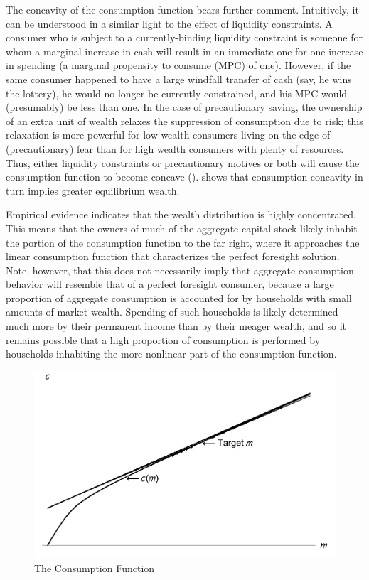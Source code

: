 The concavity of the consumption function bears further comment.
Intuitively, it can be understood in a similar light to the effect of
liquidity constraints. A consumer who is subject to a
currently-binding liquidity constraint is someone for whom a marginal
increase in cash will result in an immediate one-for-one increase in
spending (a marginal propensity to consume (MPC) of one).  However, if
the same consumer happened to have a large windfall transfer of cash
(say, he wins the lottery), he would no longer be currently
constrained, and his MPC would (presumably) be less than one.  In the
case of precautionary saving, the ownership of an extra unit of wealth
relaxes the suppression of consumption due to risk; this relaxation is
more powerful for low-wealth consumers living on the edge of
(precautionary) fear than for high wealth consumers with plenty of
resources.  Thus, either liquidity constraints or precautionary
motives or both will cause the consumption function to become concave
(\cite{carroll&kimball:liquidity}). \cite{huggett:higherW} shows that
consumption concavity in turn implies greater equilibrium wealth.  

Empirical evidence indicates that the wealth distribution is highly
concentrated.  This means that the owners of much of the aggregate
capital stock likely inhabit the portion of the consumption function
to the far right, where it approaches the linear consumption function
that characterizes the perfect foresight solution.  Note, however,
that this does not necessarily imply that aggregate consumption
behavior will resemble that of a perfect foresight consumer, because a
large proportion of aggregate consumption is accounted for by
households with small amounts of market wealth.  Spending of such
households is likely determined much more by their permanent income
than by their meager wealth, and so it remains possible that a high
proportion of consumption is performed by households inhabiting the
more nonlinear part of the consumption function.

\begin{figure}[ht]
\caption{The Consumption Function}
\centerline{\includegraphics[width=5.5in]{./Figures/PalgraveTargetPlot}}
\label{fig:ConsFunc}
\end{figure}

